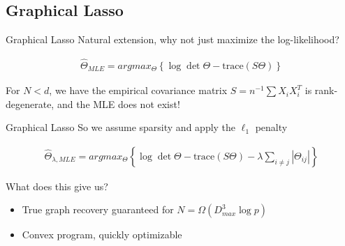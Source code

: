 \documentclass{beamer}
\begin{document}
\subsection{Graphical Lasso}

\begin{frame}{Graphical Lasso}
Natural extension, why not just maximize the log-likelihood?

\begin{gather*}
    \hat{\Theta}_{MLE}
    =
    argmax_\Theta
    \left\{
        \log \det \Theta - \text{trace}(S\Theta)
    \right\}
\end{gather*}

For $N<d$, we have the empirical covariance matrix $S = n^{-1}\sum X_i X_i^T$ is rank-degenerate, and the MLE does not exist!

\end{frame}



\begin{frame}{Graphical Lasso}
So we assume sparsity and apply the $\ell_1$ penalty

\begin{gather*}
    \hat{\Theta}_{\lambda, MLE}
    =
    argmax_\Theta
    \left\{
        \log \det \Theta - \text{trace}(S\Theta)
        -
        \lambda \sum_{i\neq j} |\Theta_{ij}|
    \right\}
\end{gather*}

What does this give us? 
\begin{itemize}
    \item True graph recovery guaranteed for $N=\Omega(D_{max}^3\log p)$
    \item Convex program, quickly optimizable 
\end{itemize}
\end{frame}
\end{document}
